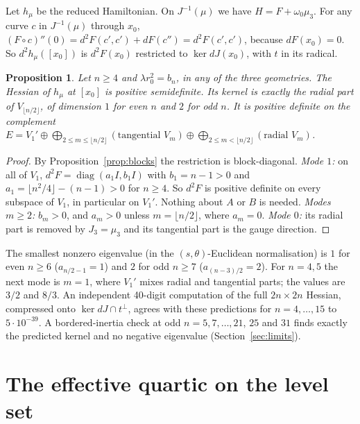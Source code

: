 \documentclass[11pt]{article}
\newtheorem{proposition}[theorem]{Proposition}
\theoremstyle{definition}
\theoremstyle{remark}
\newcommand{\floor}[1]{\lfloor #1\rfloor}
\begin{document}
Let $h_\mu$ be the reduced Hamiltonian. On $J^{-1}(\mu)$ we have $H=F+\omega_0\mu_3$. For any curve $c$
in $J^{-1}(\mu)$ through $x_0$, $(F\circ c)''(0)=d^2F(c',c')+dF(c'')=d^2F(c',c')$, because $dF(x_0)=0$. So
$d^2h_\mu([x_0])$ is $d^2F(x_0)$ restricted to $\ker dJ(x_0)$, with $t$ in its radical.

\begin{proposition}\label{prop:spectral}
Let $n\ge4$ and $\lambda r_0^2=b_n$, in any of the three geometries. The Hessian of $h_\mu$ at $[x_0]$ is
positive semidefinite. Its kernel is exactly the radial part of $V_{\floor{n/2}}$, of dimension $1$ for
even $n$ and $2$ for odd $n$. It is positive definite on the complement
$E=V_1'\oplus\bigoplus_{2\le m\le\floor{n/2}}(\text{tangential }V_m)\oplus\bigoplus_{2\le m<\floor{n/2}}
(\text{radial }V_m)$.
\end{proposition}

\begin{proof}
By Proposition~\ref{prop:blocks} the restriction is block-diagonal.
\emph{Mode $1$:} on all of $V_1$, $d^2F=\operatorname{diag}(a_1I,b_1I)$ with $b_1=n-1>0$ and
$a_1=\floor{n^2/4}-(n-1)>0$ for $n\ge4$. So $d^2F$ is positive definite on every subspace of $V_1$,
in particular on $V_1'$. Nothing about $A$ or $B$ is needed.
\emph{Modes $m\ge2$:} $b_m>0$, and $a_m>0$ unless $m=\floor{n/2}$, where $a_m=0$.
\emph{Mode $0$:} its radial part is removed by $J_3=\mu_3$ and its tangential part is the gauge direction.
\end{proof}

\noindent
The smallest nonzero eigenvalue (in the $(s,\theta)$-Euclidean normalisation) is $1$ for even $n\ge6$
($a_{n/2-1}=1$) and $2$ for odd $n\ge7$ ($a_{(n-3)/2}=2$). For $n=4,5$ the next mode is $m=1$, where
$V_1'$ mixes radial and tangential parts; the values are $3/2$ and $8/3$. An independent 40-digit computation of the full
$2n\times2n$ Hessian, compressed onto $\ker dJ\cap t^\perp$, agrees with these predictions for $n=4,\dots,15$
to $5\cdot10^{-39}$. A bordered-inertia check at odd $n=5,7,\dots,21$, $25$ and $31$ finds exactly the predicted kernel and
no negative eigenvalue (Section~\ref{sec:limits}).

\section{The effective quartic on the level set}\label{sec:quartic}
\end{document}
